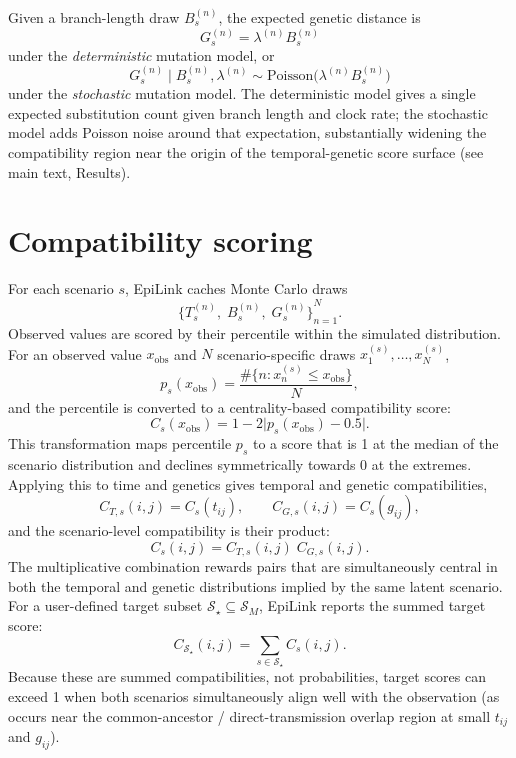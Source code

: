 \documentclass[11pt,a4paper]{article}
\begin{document}
Given a branch-length draw $B_s^{(n)}$, the expected genetic distance is
\[
	G_s^{(n)} = \lambda^{(n)} B_s^{(n)}
\]
under the \emph{deterministic} mutation model, or
\[
	G_s^{(n)} \mid B_s^{(n)}, \lambda^{(n)}
	\sim \mathrm{Poisson}\!\bigl(\lambda^{(n)} B_s^{(n)}\bigr)
\]
under the \emph{stochastic} mutation model. The deterministic model gives a single expected substitution count given branch length and clock rate; the stochastic model adds Poisson noise around that expectation, substantially widening the compatibility region near the origin of the temporal-genetic score surface (see main text, Results).

\section{Compatibility scoring}\label{sec:S1_scoring}

For each scenario $s$, EpiLink caches Monte Carlo draws
\[
	{\bigl\{T_s^{(n)},\; B_s^{(n)},\; G_s^{(n)}\bigr\}}_{n=1}^{N}.
\]
Observed values are scored by their percentile within the simulated distribution. For an observed value $x_{\mathrm{obs}}$ and $N$ scenario-specific draws $x_1^{(s)},\ldots,x_N^{(s)}$,
\[
	p_s(x_{\mathrm{obs}})
	= \frac{\#\bigl\{n : x_n^{(s)} \le x_{\mathrm{obs}}\bigr\}}{N},
\]
and the percentile is converted to a centrality-based compatibility score:
\[
	C_s(x_{\mathrm{obs}})
	= 1 - 2\bigl|p_s(x_{\mathrm{obs}}) - 0.5\bigr|.
\]
This transformation maps percentile $p_s$ to a score that is 1 at the median of the scenario distribution and declines symmetrically towards 0 at the extremes. Applying this to time and genetics gives temporal and genetic compatibilities,
\[
	C_{T,s}(i,j) = C_s(t_{ij}), \qquad
	C_{G,s}(i,j) = C_s(g_{ij}),
\]
and the scenario-level compatibility is their product:
\[
	C_s(i,j) = C_{T,s}(i,j)\; C_{G,s}(i,j).
\]
The multiplicative combination rewards pairs that are simultaneously central in both the temporal and genetic distributions implied by the same latent scenario. For a user-defined target subset $\mathcal{S}_\star \subseteq \mathcal{S}_M$, EpiLink reports the summed target score:
\[
	C_{\mathcal{S}_\star}(i,j) = \sum_{s \in \mathcal{S}_\star} C_s(i,j).
\]
Because these are summed compatibilities, not probabilities, target scores can exceed 1 when both scenarios simultaneously align well with the observation (as occurs near the common-ancestor / direct-transmission overlap region at small $t_{ij}$ and $g_{ij}$).
\end{document}
